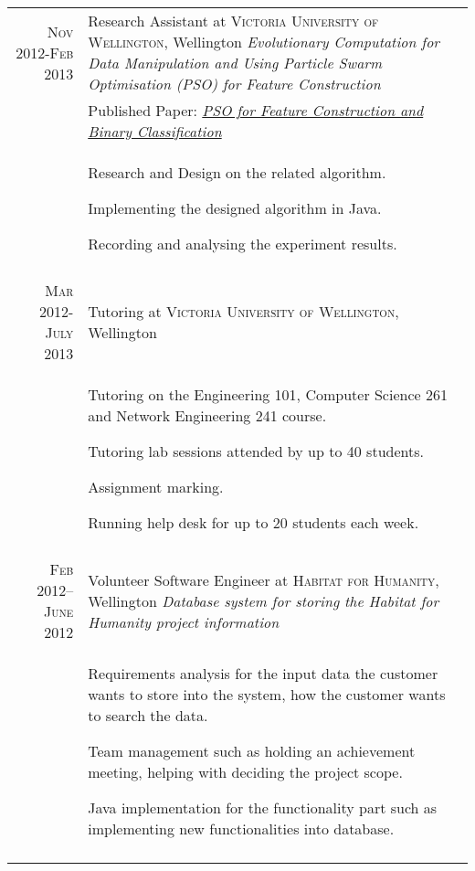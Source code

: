\documentclass[a4paper,10pt]{article} %
\begin{document}
\begin{tabular}{r|p{11cm}}

\textsc{Nov 2012-Feb 2013} & Research Assistant at \textsc{Victoria University of Wellington}, Wellington \emph{Evolutionary Computation for Data Manipulation and Using Particle Swarm Optimisation (PSO) for Feature Construction}\\
& Published Paper: \emph{\href{http://dl.acm.org/citation.cfm?id=2463376}{PSO for Feature Construction and Binary Classification}}\\
& \footnotesize{Research and Design on the related algorithm. 

Implementing the designed algorithm in Java.

Recording and analysing the experiment results.
}\\
\multicolumn{2}{c}{} \\


\textsc{Mar 2012-July 2013} & Tutoring at \textsc{Victoria University of Wellington}, Wellington \emph{}\\
& \footnotesize{Tutoring on the Engineering 101, Computer Science 261 and Network Engineering 241 course.

Tutoring lab sessions attended by up to 40 students.

Assignment marking.

Running help desk for up to 20 students each week.
}\\
\multicolumn{2}{c}{} \\


\textsc{Feb 2012–June 2012} & Volunteer Software Engineer at \textsc{Habitat for Humanity}, Wellington
 \emph{Database system for storing the Habitat for Humanity project information}\\
& \footnotesize{Requirements analysis for the input data the customer wants to store into the system, how the customer wants to search the data.

Team management such as holding an achievement meeting, helping with deciding the project scope.

Java implementation for the functionality part such as implementing new functionalities into database.

}\\
\multicolumn{2}{c}{} \\



\end{tabular}
\end{document}
